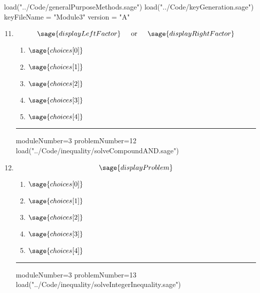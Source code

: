 \documentclass[14pt]{article}
\newcommand{\litem}[1]{\item#1\hspace*{-1cm}\rule{\textwidth}{0.4pt}}
\begin{document}
\pagestyle{fancy}

\begin{sagesilent}
load("../Code/generalPurposeMethods.sage")
load("../Code/keyGeneration.sage")
keyFileName = "Module3"
version = "A"
\end{sagesilent}

\begin{enumerate}
\setcounter{enumi}{10}


\begin{sagesilent}
moduleNumber=3
problemNumber=11
load("../Code/inequality/solveCompoundOR.sage")
\end{sagesilent}

\litem{ 
	\[ \sage{displayLeftFactor} \hspace*{4mm} \text{ or } \hspace*{4mm} \sage{displayRightFactor} \]

	\begin{enumerate}[label=\Alph*.]
    \item \( \sage{choices[0]} \)
    \item \( \sage{choices[1]} \)
    \item \( \sage{choices[2]} \)
    \item \( \sage{choices[3]} \)
    \item \( \sage{choices[4]} \)
	\end{enumerate}

}

\begin{sagesilent}
moduleNumber=3
problemNumber=12
load("../Code/inequality/solveCompoundAND.sage")
\end{sagesilent}

\litem{ 

\[ \sage{displayProblem} \]

	\begin{enumerate}[label=\Alph*.]
    \item \( \sage{choices[0]} \)
    \item \( \sage{choices[1]} \)
    \item \( \sage{choices[2]} \)
    \item \( \sage{choices[3]} \)
    \item \( \sage{choices[4]} \)
	\end{enumerate}

}

\begin{sagesilent}
moduleNumber=3
problemNumber=13
load("../Code/inequality/solveIntegerInequality.sage")
\end{sagesilent}


\end{enumerate}
\end{document}
